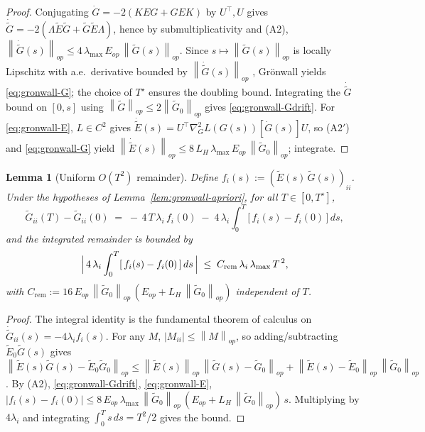 \documentclass{article}
\newtheorem{lemma}[theorem]{Lemma}
\newcommand{\norm}[1]{\left\|#1\right\|}
\newcommand{\E}{E}
\newcommand{\Gtilde}{\widetilde{G}}
\newcommand{\Etilde}{\widetilde{\E}}
\begin{document}
\begin{proof}
Conjugating $\dot G = -2(K\E G + G\E K)$ by $U^\top, U$ gives
$\dot{\Gtilde} = -2(\Lambda \Etilde \Gtilde + \Gtilde \Etilde \Lambda)$,
hence by submultiplicativity and (A2),
$\norm{\dot{\Gtilde}(s)}_{op} \leq 4\,\lambda_{\max}\,E_{op}\,
\norm{\Gtilde(s)}_{op}$.
Since $s \mapsto \norm{\Gtilde(s)}_{op}$ is locally Lipschitz with
a.e.\ derivative bounded by $\norm{\dot{\Gtilde}(s)}_{op}$
\citep[Ch.~III]{hartman2002ordinary}, Gr\"onwall yields
\eqref{eq:gronwall-G}; the choice of $T^\star$ ensures the doubling
bound. Integrating the $\dot{\Gtilde}$ bound on $[0, s]$ using
$\norm{\Gtilde}_{op}\leq 2\norm{\Gtilde_0}_{op}$ gives
\eqref{eq:gronwall-Gdrift}. For \eqref{eq:gronwall-E}, $L \in C^2$
gives $\dot{\Etilde}(s) = U^\top \nabla^2_G L(G(s))[\dot G(s)] U$, so
(A2$'$) and \eqref{eq:gronwall-G} yield
$\norm{\dot{\Etilde}(s)}_{op} \leq 8\,L_H\,\lambda_{\max}\,E_{op}\,
\norm{\Gtilde_0}_{op}$; integrate.
\end{proof}

\begin{lemma}[Uniform $O(T^2)$ remainder]
\label{lem:gronwall-remainder}
Define $f_i(s) := (\Etilde(s)\,\Gtilde(s))_{ii}$. Under the hypotheses
of Lemma~\ref{lem:gronwall-apriori}, for all $T \in [0, T^\star]$,
\[
\Gtilde_{ii}(T) - \Gtilde_{ii}(0)
\;=\; -\,4\,T\,\lambda_i\, f_i(0)
\;-\; 4\,\lambda_i \int_0^T \bigl[\,f_i(s) - f_i(0)\,\bigr]\,ds,
\]
and the integrated remainder is bounded by
\[
\Bigl|\,4\,\lambda_i \int_0^T [\,f_i(s) - f_i(0)\,]\,ds\,\Bigr|
\;\leq\; C_{\mathrm{rem}}\,\lambda_i\,\lambda_{\max}\,T^{\,2},
\]
with $C_{\mathrm{rem}} := 16\, E_{op}\,\norm{\Gtilde_0}_{op}\,
(E_{op} + L_H\,\norm{\Gtilde_0}_{op})$ independent of $T$.
\end{lemma}

\begin{proof}
The integral identity is the fundamental theorem of calculus on
$\dot{\Gtilde}_{ii}(s) = -4\lambda_i f_i(s)$. For any $M$,
$|M_{ii}|\leq\norm{M}_{op}$, so adding/subtracting $\Etilde_0\Gtilde(s)$
gives
$\norm{\Etilde(s)\Gtilde(s) - \Etilde_0\Gtilde_0}_{op} \leq
\norm{\Etilde(s)}_{op}\,\norm{\Gtilde(s) - \Gtilde_0}_{op}
+ \norm{\Etilde(s) - \Etilde_0}_{op}\,\norm{\Gtilde_0}_{op}$.
By (A2), \eqref{eq:gronwall-Gdrift}, \eqref{eq:gronwall-E},
$|f_i(s) - f_i(0)| \leq 8\,E_{op}\,\lambda_{\max}\,\norm{\Gtilde_0}_{op}\,
(E_{op} + L_H\,\norm{\Gtilde_0}_{op})\, s$. Multiplying by $4\lambda_i$
and integrating $\int_0^T s\,ds = T^2/2$ gives the bound.
\end{proof}
\end{document}

